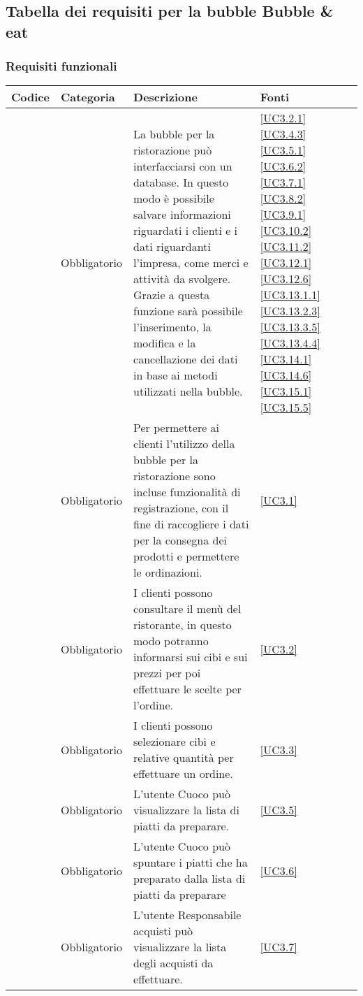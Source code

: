 \subsection{Tabella dei requisiti per la bubble Bubble \& eat}

\subsubsection{Requisiti funzionali}

\begin{longtable}{|P{1.5cm}|P{2.5cm}|P{6.5cm}|P{2.5cm}|}
	\hline \textbf{Codice} & \textbf{Categoria} & \textbf{Descrizione} & \textbf{Fonti} \\
	\hline \RequisitoObF\label{L21} & Obbligatorio & La bubble per la ristorazione può interfacciarsi con un database. In questo modo è possibile salvare informazioni riguardati i clienti e i dati riguardanti l'impresa, come merci e attività da svolgere. Grazie a questa funzione sarà possibile l'inserimento, la modifica e la cancellazione dei dati in base ai metodi utilizzati nella bubble. & \ref{UC3.2.1} \ref{UC3.4.3} \ref{UC3.5.1} \ref{UC3.6.2} \ref{UC3.7.1} \ref{UC3.8.2} \ref{UC3.9.1} \ref{UC3.10.2} \ref{UC3.11.2} \ref{UC3.12.1} \ref{UC3.12.6} \ref{UC3.13.1.1} \ref{UC3.13.2.3} \ref{UC3.13.3.5} \ref{UC3.13.4.4} \ref{UC3.14.1} \ref{UC3.14.6} \ref{UC3.15.1} \ref{UC3.15.5} \\
	\hline \RequisitoObF\label{L22} & Obbligatorio & Per permettere ai clienti l'utilizzo della bubble per la ristorazione sono incluse funzionalità di registrazione, con il fine di raccogliere i dati per la consegna dei prodotti e permettere le ordinazioni. & \ref{UC3.1} \\
	\hline \RequisitoObF\label{L23} & Obbligatorio & I clienti possono consultare il menù del ristorante, in questo modo potranno informarsi sui cibi e sui prezzi per poi effettuare le scelte per l'ordine. & \ref{UC3.2} \\
	\hline \RequisitoObF\label{L24} & Obbligatorio & I clienti possono selezionare cibi e relative quantità per effettuare un ordine. & \ref{UC3.3} \\
	\hline \RequisitoObF\label{L25} & Obbligatorio & L'utente Cuoco può visualizzare la lista di piatti da preparare. & \ref{UC3.5} \\
	\hline \RequisitoObF\label{L26} & Obbligatorio & L'utente Cuoco può spuntare i piatti che ha preparato dalla lista di piatti da preparare  & \ref{UC3.6} \\
	\hline \RequisitoObF\label{L27} & Obbligatorio & L'utente Responsabile acquisti può visualizzare la lista degli acquisti da effettuare. & \ref{UC3.7} \\

\end{longtable}
